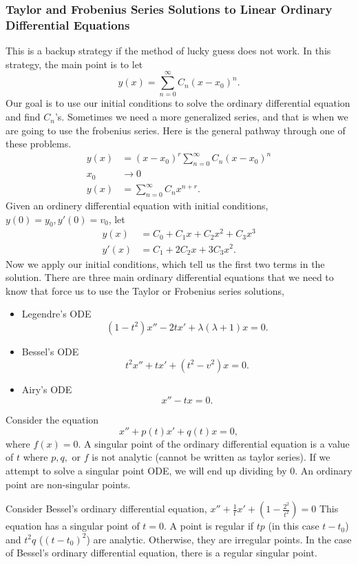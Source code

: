 \subsubsection{Taylor and Frobenius Series Solutions to Linear Ordinary Differential Equations}

This is a backup strategy if the method of lucky guess does not work. In this strategy, the main point is to let
\[
  y(x)=\sum_{n=0}^{\infty}C_n(x-x_0)^{n}
.\] 
Our goal is to use our initial conditions to solve the ordinary differential equation and find $C_n$'s. Sometimes we need a more generalized series, and that is when we are going to use the frobenius series. Here is the general pathway through one of these problems.
\begin{align*}
  y(x)&=(x-x_0)^{r}\sum_{n=0}^{\infty} C_n(x-x_0)^{n}\\
  x_0&\to 0\\
  y(x)&=\sum_{n=0}^{\infty} C_nx^{n+r}
.\end{align*}
Given an ordinery differential equation with initial conditions, $y(0)=y_0,y'(0)=v_0$, let 
\begin{align*}
  y(x)&=C_0+C_1x+C_2x^2+C_3x^3\\
  y'(x)&=C_1+2C_2x+3C_3x^2
.\end{align*}
Now we apply our initial conditions, which tell us the first two terms in the solution.
There are three main ordinary differential equations that we need to know that force us to use the Taylor or Frobenius series solutions,
\begin{itemize}
  \item Legendre's ODE
    \[
      (1-t^2)x''-2tx'+\lambda(\lambda+1)x=0
    .\] 
  \item Bessel's ODE
    \[
      t^2x''+tx'+(t^2-v^2)x=0
    .\] 
  \item Airy's ODE
    \[
    x''-tx=0
    .\] 
\end{itemize}
\begin{theorem}
  Consider the equation 
  \[
    x''+p(t)x'+q(t)x=0
  ,\] where $f(x)=0$. A singular point of the ordinary differential equation is a value of $t$ where $p,q,\text{ or }f$ is not analytic (cannot be written as taylor series). If we attempt to solve a singular point ODE, we will end up dividing by 0. An ordinary point are non-singular points. 
\end{theorem}
Consider Bessel's ordinary differential equation, $x''+\frac{1}{t}x'+\left( 1-\frac{2^2}{t^2} \right) = 0 $ This equation has a singular point of $t=0$. A point is regular if $tp$ (in this case $t-t_0$) and $t^2q$ ($\left( t-t_0 \right) ^2$) are analytic. Otherwise, they are irregular points. In the case of Bessel's ordinary differential equation, there is a regular singular point.
